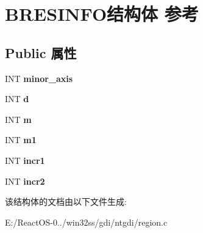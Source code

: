\hypertarget{struct_b_r_e_s_i_n_f_o}{}\section{B\+R\+E\+S\+I\+N\+F\+O结构体 参考}
\label{struct_b_r_e_s_i_n_f_o}
\subsection*{Public 属性}
\begin{DoxyCompactItemize}
\item 
\mbox{\label{struct_b_r_e_s_i_n_f_o_a54d406e72bc28f4cfe49ce31d09a8a95}} 
I\+NT {\bfseries minor\+\_\+axis}
\item 
\mbox{\label{struct_b_r_e_s_i_n_f_o_ac66629f992761da6478369d8e5031975}} 
I\+NT {\bfseries d}
\item 
\mbox{\label{struct_b_r_e_s_i_n_f_o_a6a2eb5c6f499e35bcd1d1f736d7e3807}} 
I\+NT {\bfseries m}
\item 
\mbox{\label{struct_b_r_e_s_i_n_f_o_a0c12758dc4de03195396dd8aeebd52e7}} 
I\+NT {\bfseries m1}
\item 
\mbox{\label{struct_b_r_e_s_i_n_f_o_a63208433859629847a1f9895038a71e4}} 
I\+NT {\bfseries incr1}
\item 
\mbox{\label{struct_b_r_e_s_i_n_f_o_a9b50ae2c1dc968220cc3dde24536ef9b}} 
I\+NT {\bfseries incr2}
\end{DoxyCompactItemize}


该结构体的文档由以下文件生成\+:\begin{DoxyCompactItemize}
\item 
E\+:/\+React\+O\+S-\/0../win32ss/gdi/ntgdi/region.\+c\end{DoxyCompactItemize}
